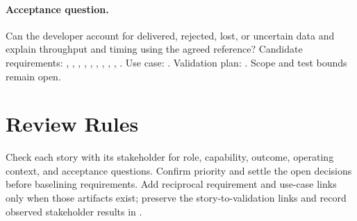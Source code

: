 \paragraph{Acceptance question.} Can the developer account for delivered, rejected, lost, or uncertain data and explain throughput and timing using the agreed reference?
\noindent Candidate requirements: , , , , , , , , , . Use case: . Validation plan: . Scope and test bounds remain open.

\section{Review Rules}
Check each story with its stakeholder for role, capability, outcome, operating
context, and acceptance questions. Confirm priority and settle the open
decisions before baselining requirements. Add reciprocal requirement and
use-case links only when those artifacts exist; preserve the story-to-validation
links and record observed stakeholder results in .

